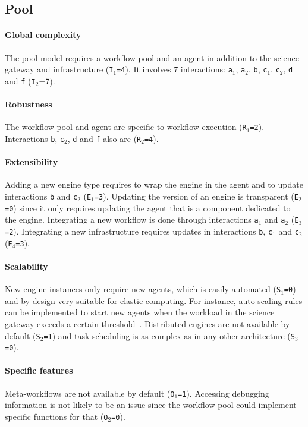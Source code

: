 \documentclass[preprint,3p,twocolumn]{elsarticle}
\begin{document}
\subsection{Pool}

\paragraph{Global complexity} The pool model requires a workflow pool and an
agent in addition to the science gateway and infrastructure
(\texttt{I$_1$=4}). It involves 7 interactions: \texttt{a$_1$},
\texttt{a$_2$}, \texttt{b}, \texttt{c$_1$}, \texttt{c$_2$}, \texttt{d}
and \texttt{f} (\texttt{I$_2$}=7).

\paragraph{Robustness} The workflow pool and agent are specific to
workflow execution (\texttt{R$_1$=2}). Interactions \texttt{b},
\texttt{c$_2$}, \texttt{d} and \texttt{f} also are (\texttt{R$_2$=4}).

\paragraph{Extensibility} Adding a new engine type requires to wrap
the engine in the agent and to update interactions \texttt{b} and
\texttt{c$_2$} (\texttt{E$_1$=3}). Updating the version of an engine
is transparent (\texttt{E$_2$=0}) since it only requires updating the
agent that is a component dedicated to the engine. Integrating a new workflow is
done through interactions \texttt{a$_1$} and \texttt{a$_2$}
(\texttt{E$_3$=2}). Integrating a new infrastructure requires updates
in interactions \texttt{b}, \texttt{c$_1$} and \texttt{c$_2$}
(\texttt{E$_4$=3}).

\paragraph{Scalability} New engine instances only require new agents,
which is easily automated (\texttt{S$_1$=0}) and by design very
suitable for elastic computing. For instance, auto-scaling rules can
be implemented to start new agents when the workload in the science
gateway exceeds a certain threshold~\cite{lorido2012auto}. Distributed
engines are not available by default (\texttt{S$_2$=1}) and task
scheduling is as complex as in any other architecture
(\texttt{S$_3$=0}).

\paragraph{Specific features} Meta-workflows are not available by default
(\texttt{O$_1$=1}).  Accessing debugging information is not likely to
be an issue since the workflow pool could implement specific functions
for that (\texttt{O$_2$=0}).
\end{document}
